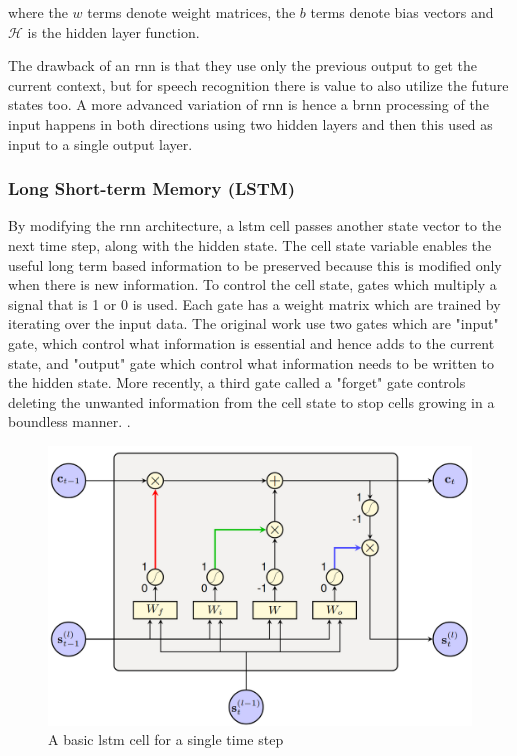 where the $w$ terms denote weight matrices, the $b$ terms denote bias vectors and $\mathcal{H}$ is the hidden layer function. \cite{Graves2013SpeechNetworks}

The drawback of an \acrshort{rnn} is that they use only the previous output to get the current context, but for speech recognition there is value to also utilize the future states too. A more advanced variation of \acrshort{rnn} is hence a \acrfull{brnn} \cite{Schuster1997BidirectionalNetworks} processing of the input happens in both directions using two hidden layers and then this used as input to a single output layer. 

\subsubsection{Long Short-term Memory (LSTM)}
By modifying the \acrshort{rnn} architecture, a \acrfull{lstm} cell \cite{Hochreiter1997LongMemory} passes another state vector to the next time step, along with the hidden state. The cell state variable enables the useful long term based information to be preserved because this is modified only when there is new information. To control the cell state, gates which multiply a signal that is 1 or 0 is used. Each gate has a weight matrix which are trained by iterating over the input data. The original work use two gates which are "input" gate, which control what information is essential and hence adds to the current state, and "output" gate which control what information needs to be written to the hidden state. More recently, a third gate called a "forget" gate controls deleting the unwanted information  from the cell state to stop cells growing in a boundless manner. \cite{Gers2000LearningLSTM}.

\begin{figure}[ht]
  \begin{center}
    \includegraphics[width=\textwidth]{images/lstm.png} 
    \caption{A basic \acrshort{lstm} cell for a single time step \cite{Enarvi2018ModelingRecognition}}
    \label{fig:lstm}
  \end{center}
\end{figure}

